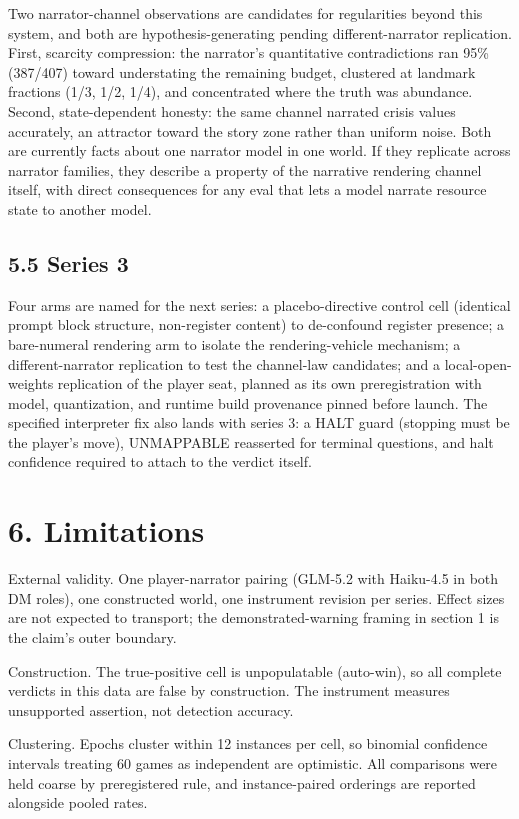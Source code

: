\documentclass[11pt]{article}
\begin{document}
Two narrator-channel observations are candidates for regularities beyond
this system, and both are hypothesis-generating pending
different-narrator replication. First, scarcity compression: the
narrator's quantitative contradictions ran 95\% (387/407) toward
understating the remaining budget, clustered at landmark fractions (1/3,
1/2, 1/4), and concentrated where the truth was abundance. Second,
state-dependent honesty: the same channel narrated crisis values
accurately, an attractor toward the story zone rather than uniform
noise. Both are currently facts about one narrator model in one world.
If they replicate across narrator families, they describe a property of
the narrative rendering channel itself, with direct consequences for any
eval that lets a model narrate resource state to another model.

\subsection*{5.5 Series 3}

Four arms are named for the next series: a placebo-directive control
cell (identical prompt block structure, non-register content) to
de-confound register presence; a bare-numeral rendering arm to isolate
the rendering-vehicle mechanism; a different-narrator replication to
test the channel-law candidates; and a local-open-weights replication of
the player seat, planned as its own preregistration with model,
quantization, and runtime build provenance pinned before launch. The
specified interpreter fix also lands with series 3: a HALT guard
(stopping must be the player's move), UNMAPPABLE reasserted for terminal
questions, and halt confidence required to attach to the verdict itself.

\section*{6. Limitations}

External validity. One player-narrator pairing (GLM-5.2 with Haiku-4.5
in both DM roles), one constructed world, one instrument revision per
series. Effect sizes are not expected to transport; the
demonstrated-warning framing in section 1 is the claim's outer boundary.

Construction. The true-positive cell is unpopulatable (auto-win), so all
complete verdicts in this data are false by construction. The instrument
measures unsupported assertion, not detection accuracy.

Clustering. Epochs cluster within 12 instances per cell, so binomial
confidence intervals treating 60 games as independent are optimistic.
All comparisons were held coarse by preregistered rule, and
instance-paired orderings are reported alongside pooled rates.
\end{document}
